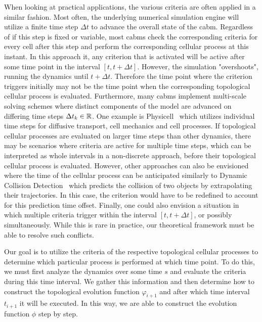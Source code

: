 When looking at practical applications, the various criteria are often applied in a similar fashion.
Most often, the underlying numerical simulation engine will utilize a finite time step $\Delta t$ to
advance the overall state of the \ac{cabm}.
Regardless of if this step is fixed or variable, most \acp{cabm} check the corresponding criteria
for every cell after this step and perform the corresponding cellular process at this instant.
In this approach it, any criterion that is activated will be active after some time point in the
interval $[t,t+\Delta t]$.
However, the simulation "overshoots", running the dynamics until $t+\Delta t$.
Therefore the time point where the criterion triggers initially may not be the time point when the
corresponding topological cellular process is evaluated.
Furthermore, many \acp{cabm} implement multi-scale solving schemes where distinct components of the
model are advanced on differing time steps $\Delta t_k\in\mathbb{R}$.
One example is Physicell~\cite{Ghaffarizadeh2018} which utilizes individual time steps for diffusive
transport, cell mechanics and cell processes.
If topological cellular processes are evaluated on larger time steps than other dynamics, there may
be scenarios where criteria are active for multiple time steps, which can be interpreted as whole
intervals in a non-discrete approach, before their topological cellular process is evaluated.
However, other approaches can also be envisioned where the time of the cellular process can be
anticipated similarly to Dynamic Collision Detection~\cite{Mirtich2000,Wang2022} which predicts the
collision of two objects by extrapolating their trajectories.
In this case, the criterion would have to be redefined to account for this prediction time offset.
Finally, one could also envision a situation in which multiple criteria trigger within the interval
$[t,t+\Delta t]$, or possibly simultaneously.
While this is rare in practice, our theoretical framework must be able to resolve such conflicts.

Our goal is to utilize the criteria of the respective topological cellular processes to determine
which particular process is performed at which time point.
To do this, we must first analyze the dynamics over some time $s$ and evaluate the criteria during
this time interval.
We gather this information and then determine how to construct the topological evolution function
$\varphi_{i+1}$ and after which time interval $t_{i+1}$ it will be executed.
In this way, we are able to construct the evolution function $\phi$ step by step.

